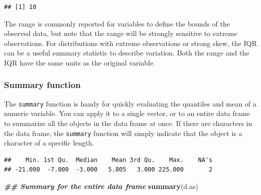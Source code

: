 \documentclass[
]{book}
\newenvironment{Shaded}{\begin{snugshade}}{\end{snugshade}}
\newcommand{\DocumentationTok}[1]{\textcolor[rgb]{0.56,0.35,0.01}{\textbf{\textit{#1}}}}
\newcommand{\FunctionTok}[1]{\textcolor[rgb]{0.13,0.29,0.53}{\textbf{#1}}}
\newcommand{\NormalTok}[1]{#1}
\newcommand{\SpecialCharTok}[1]{\textcolor[rgb]{0.81,0.36,0.00}{\textbf{#1}}}
\begin{document}
\begin{verbatim}
## [1] 10
\end{verbatim}

The range is commonly reported for variables to define the bounds of the observed data, but note that the range will be strongly sensitive to extreme observations. For distributions with extreme observations or strong skew, the IQR can be a useful summary statistic to describe variation. Both the range and the IQR have the same units as the original variable.

\subsubsection{Summary function}\label{summary-function}

The \texttt{summary} function is handy for quickly evaluating the quantiles and mean of a numeric variable. You can apply it to a single vector, or to an entire data frame to summarize all the objects in the data frame at once. If there are characters in the data frame, the \texttt{summary} function will simply indicate that the object is a character of a specific length.

\begin{Shaded}
\end{Shaded}

\begin{verbatim}
##    Min. 1st Qu.  Median    Mean 3rd Qu.    Max.    NA's 
## -21.000  -7.000  -3.000   5.805   3.000 225.000       2
\end{verbatim}

\begin{Shaded}
\begin{Highlighting}[]
\DocumentationTok{\#\# Summary for the entire data frame}
\FunctionTok{summary}\NormalTok{(d.as)}
\end{Highlighting}
\end{Shaded}
\end{document}
